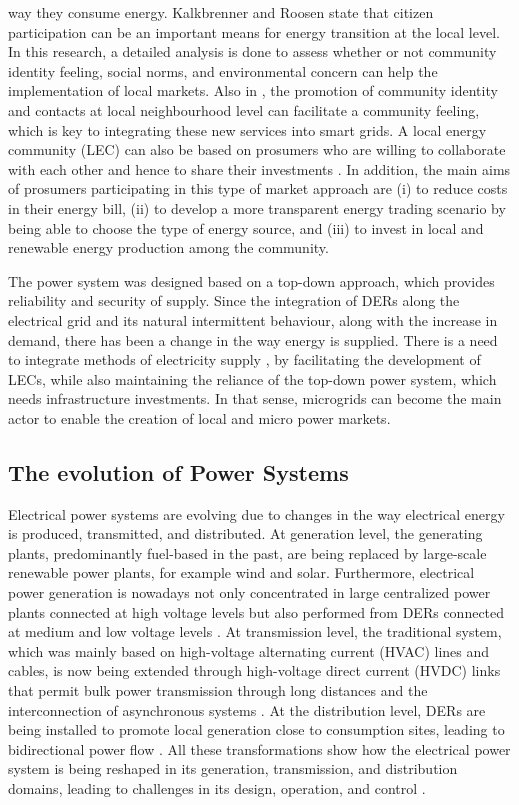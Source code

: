 way they consume energy. Kalkbrenner and Roosen \cite{kalkbrenner2016citizens} state that citizen participation can be an important means for energy transition at the local level. In this research, a detailed analysis is done to assess whether or not community identity feeling, social norms, and environmental concern can help the implementation of local markets. Also in \cite{kalkbrenner2016citizens}, the promotion of community identity and contacts at local neighbourhood level can facilitate a community feeling, which is key to integrating these new services into smart grids. A local energy community (LEC) can also be based on prosumers who are willing to collaborate with each other and hence to share their investments \cite{sousa2018peer}. In addition, the main aims of prosumers participating in this type of market approach are (i) to reduce costs in their energy bill, (ii) to develop a more transparent energy trading scenario by being able to choose the type of energy source, and (iii) to invest in local and renewable energy production among the community.

The power system was designed based on a top-down approach, which provides reliability and security of supply. Since the integration of DERs along the electrical grid and its natural intermittent behaviour, along with the increase in demand, there has been a change in the way energy is supplied. There is a need to integrate methods of electricity supply \cite{peng2017electricity}, by facilitating the development of LECs, while also maintaining the reliance of the top-down power system, which needs infrastructure investments. In that sense, microgrids can become the main actor to enable the creation of local and micro power markets. 

\subsection{The evolution of Power Systems}

Electrical power systems are evolving due to changes in the way electrical energy is produced, transmitted, and distributed. At generation level, the generating plants, predominantly fuel-based in the past, are being replaced by large-scale renewable power plants, for example wind and solar. Furthermore, electrical power generation is nowadays not only concentrated in large centralized power plants connected at high voltage levels but also performed from DERs connected at medium and low voltage levels \cite{Vittal2012}. At transmission level, the traditional system, which was mainly based on high-voltage alternating current (HVAC) lines and cables, is
now being extended through high-voltage direct current (HVDC) links that permit bulk power transmission through long distances and the interconnection of asynchronous systems \cite{van2016hvdc}. At the distribution level, DERs are being installed to promote local generation close to consumption sites, leading to bidirectional power flow \cite{series2009microgrids}. All these transformations show how the electrical power system is being reshaped in its generation, transmission, and distribution domains, leading to challenges in its design, operation, and control \cite{miller2015status, farrokhabadi2018microgrid}. 

